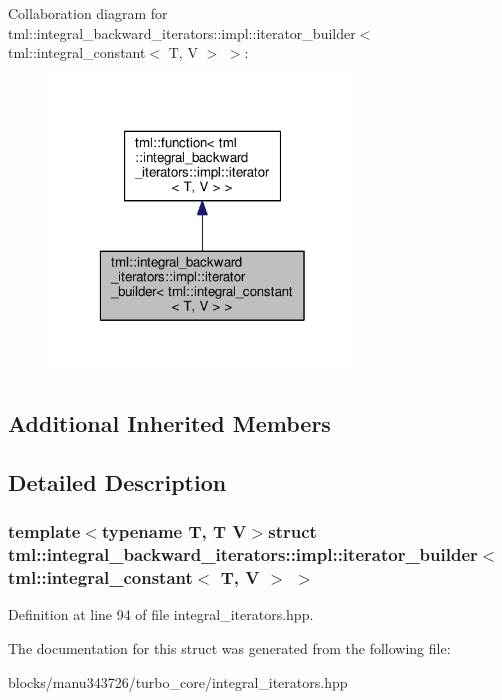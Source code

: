 Collaboration diagram for tml\+:\+:integral\+\_\+backward\+\_\+iterators\+:\+:impl\+:\+:iterator\+\_\+builder$<$ tml\+:\+:integral\+\_\+constant$<$ T, V $>$ $>$\+:
\nopagebreak
\begin{figure}[H]
\begin{center}
\leavevmode
\includegraphics[width=232pt]{structtml_1_1integral__backward__iterators_1_1impl_1_1iterator__builder_3_01tml_1_1integral__conb1f111440f33eeab32b734f52243781e}
\end{center}
\end{figure}
\subsection*{Additional Inherited Members}


\subsection{Detailed Description}
\subsubsection*{template$<$typename T, T V$>$struct tml\+::integral\+\_\+backward\+\_\+iterators\+::impl\+::iterator\+\_\+builder$<$ tml\+::integral\+\_\+constant$<$ T, V $>$ $>$}



Definition at line 94 of file integral\+\_\+iterators.\+hpp.



The documentation for this struct was generated from the following file\+:\begin{DoxyCompactItemize}
\item 
blocks/manu343726/turbo\+\_\+core/integral\+\_\+iterators.\+hpp\end{DoxyCompactItemize}
